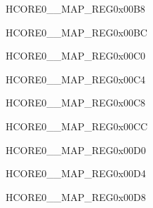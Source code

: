 \begin{register}{H}{CORE0\_\_MAP\_REG}{0x00B8}\label{regdesc:CORE0TIMERGRP0T0INTMAPREG}
\end{register}\vspace{-3em}


\begin{register}{H}{CORE0\_\_MAP\_REG}{0x00BC}\label{regdesc:CORE0TIMERGRP0T1INTMAPREG}
\end{register}\vspace{-3em}


\begin{register}{H}{CORE0\_\_MAP\_REG}{0x00C0}\label{regdesc:CORE0TIMERGRP0WDTINTMAPREG}
\end{register}\vspace{-3em}


\begin{register}{H}{CORE0\_\_MAP\_REG}{0x00C4}\label{regdesc:CORE0TIMERGRP1T0INTMAPREG}
\end{register}\vspace{-3em}


\begin{register}{H}{CORE0\_\_MAP\_REG}{0x00C8}\label{regdesc:CORE0TIMERGRP1T1INTMAPREG}
\end{register}\vspace{-3em}


\begin{register}{H}{CORE0\_\_MAP\_REG}{0x00CC}\label{regdesc:CORE0TIMERGRP1WDTINTMAPREG}
\end{register}\vspace{-3em}


\begin{register}{H}{CORE0\_\_MAP\_REG}{0x00D0}\label{regdesc:CORE0LEDCINTMAPREG}
\end{register}\vspace{-3em}


\begin{register}{H}{CORE0\_\_MAP\_REG}{0x00D4}\label{regdesc:CORE0SYSTIMERTARGET0INTMAPREG}
\end{register}\vspace{-3em}


\begin{register}{H}{CORE0\_\_MAP\_REG}{0x00D8}\label{regdesc:CORE0SYSTIMERTARGET1INTMAPREG}
\end{register}\vspace{-3em}


